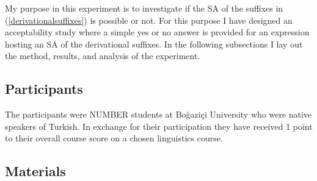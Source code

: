 My purpose in this experiment is to investigate if the SA of the suffixes in (\ref{derivationalsuffixes}) is possible or not. For this purpose I have designed an acceptability study where a simple yes or no answer is provided for an expression hosting an SA of the derivational suffixes. In the following subsections I lay out the method, results, and analysis of the experiment.

\subsection{Participants}

The participants were NUMBER students at Boğaziçi University who were native speakers of Turkish. In exchange for their participation they have received 1 point to their overall course score on a chosen linguistics course.

\subsection{Materials}

